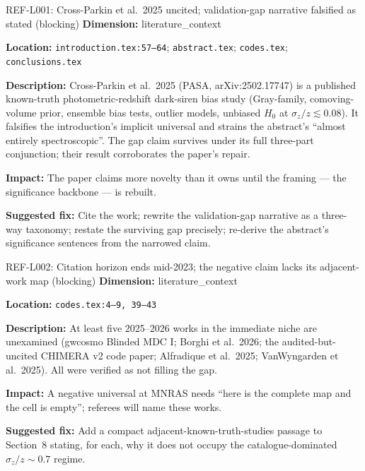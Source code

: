 \documentclass[11pt]{article}
\begin{document}
\begin{MajorIssueBox}{REF-L001: Cross-Parkin et al.\ 2025 uncited; validation-gap narrative falsified as stated (blocking)}
\textbf{Dimension:} literature\_context

\textbf{Location:} \texttt{introduction.tex:57--64}; \texttt{abstract.tex}; \texttt{codes.tex}; \texttt{conclusions.tex}

\textbf{Description:} Cross-Parkin et al.\ 2025 (PASA, arXiv:2502.17747) is a published known-truth photometric-redshift dark-siren bias study (Gray-family, comoving-volume prior, ensemble bias tests, outlier models, unbiased $H_0$ at $\sigma_z/z \lesssim 0.08$). It falsifies the introduction's implicit universal and strains the abstract's ``almost entirely spectroscopic''. The gap claim survives under its full three-part conjunction; their result corroborates the paper's repair.

\textbf{Impact:} The paper claims more novelty than it owns until the framing --- the significance backbone --- is rebuilt.

\textbf{Suggested fix:} Cite the work; rewrite the validation-gap narrative as a three-way taxonomy; restate the surviving gap precisely; re-derive the abstract's significance sentences from the narrowed claim.
\end{MajorIssueBox}

\begin{MajorIssueBox}{REF-L002: Citation horizon ends mid-2023; the negative claim lacks its adjacent-work map (blocking)}
\textbf{Dimension:} literature\_context

\textbf{Location:} \texttt{codes.tex:4--9, 39--43}

\textbf{Description:} At least five 2025--2026 works in the immediate niche are unexamined (gwcosmo Blinded MDC I; Borghi et al.\ 2026; the audited-but-uncited CHIMERA v2 code paper; Alfradique et al.\ 2025; VanWyngarden et al.\ 2025). All were verified as not filling the gap.

\textbf{Impact:} A negative universal at MNRAS needs ``here is the complete map and the cell is empty''; referees will name these works.

\textbf{Suggested fix:} Add a compact adjacent-known-truth-studies passage to Section~8 stating, for each, why it does not occupy the catalogue-dominated $\sigma_z/z \sim 0.7$ regime.
\end{MajorIssueBox}
\end{document}
